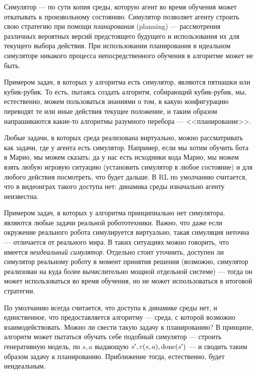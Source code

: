 Симулятор --- по сути копия среды, которую агент во время обучения может откатывать к произвольному состоянию. Симулятор позволяет агенту строить свою стратегию при помощи \emph{планирования} (planning) --- рассмотрения различных вероятных версий предстоящего будущего и использования их для текущего выбора действия. При использовании планирования в идеальном симуляторе никакого процесса непосредственного обучения в алгоритме может не быть.

\begin{example}
Примером задач, в которых у алгоритма есть симулятор, являются пятнашки или кубик-рубик. То есть, пытаясь создать алгоритм, собирающий кубик-рубик, мы, естественно, можем пользоваться знаниями о том, в какую конфигурацию переводят те или иные действия текущее положение, и таким образом напрашиваются какие-то алгоритмы разумного перебора --- <<планирование>>.
\end{example}

\begin{example}
Любые задачи, в которых среда реализована виртуально, можно рассматривать как задачи, где у агента есть симулятор. Например, если мы хотим обучить бота в Марио, мы можем сказать: да у нас есть исходники кода Марио, мы можем взять любую игровую ситуацию (установить симулятор в любое состояние) и для любого действия посмотреть, что будет дальше. В RL по умолчанию считается, что в видеоиграх такого доступа нет: динамика среды изначально агенту неизвестна.
\end{example}

\begin{example}
Примером задач, в которых у алгоритма принципиально нет симулятора, являются любые задачи реальной робототехники. Важно, что даже если окружение реального робота симулируется виртуально, такая симуляция неточна --- отличается от реального мира. В таких ситуациях можно говорить, что имеется \emph{неидеальный симулятор}. Отдельно стоит уточнить, доступен ли симулятор реальному роботу в момент принятия решения (возможно, симулятор реализован на куда более вычислительно мощной отдельной системе) --- тогда он может использоваться во время обучения, но не может использоваться в итоговой стратегии.
\end{example}

По умолчанию всегда считается, что доступа к динамике среды нет, и единственное, что предоставляется алгоритму --- среда, с которой возможно взаимодействовать. Можно ли свести такую задачу к планированию? В принципе, алгоритм может пытаться обучать себе подобный симулятор --- строить генеративную модель, по $s, a$ выдающую $s', r(s, a), \mathrm{done}(s')$ --- и сводить таким образом задачу к планированию. Приближение тогда, естественно, будет неидеальным.

